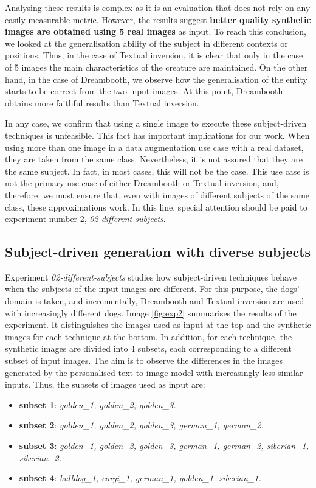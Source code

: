 Analysing these results is complex as it is an evaluation that does not rely on any easily measurable metric. However, the results suggest \textbf{better quality synthetic images are obtained using 5 real images} as input. To reach this conclusion, we looked at the generalisation ability of the subject in different contexts or positions. Thus, in the case of Textual inversion, it is clear that only in the case of 5 images the main characteristics of the creature are maintained. On the other hand, in the case of Dreambooth, we observe how the generalisation of the entity starts to be correct from the two input images. At this point, Dreambooth obtains more faithful results than Textual inversion.

In any case, we confirm that using a single image to execute these subject-driven techniques is unfeasible. This fact has important implications for our work. When using more than one image in a data augmentation use case with a real dataset, they are taken from the same class. Nevertheless, it is not assured that they are the same subject. In fact, in most cases, this will not be the case. This use case is not the primary use case of either Dreambooth or Textual inversion, and, therefore, we must ensure that, even with images of different subjects of the same class, these approximations work. In this line, special attention should be paid to experiment number 2, \textit{02-different-subjects}.

\subsection{Subject-driven generation with diverse subjects} \label{sec: exp-02}

Experiment \textit{02-different-subjects} studies how subject-driven techniques behave when the subjects of the input images are different. For this purpose, the dogs' domain is taken, and incrementally, Dreambooth and Textual inversion are used with increasingly different dogs. Image \ref{fig:exp2} summarises the results of the experiment. It distinguishes the images used as input at the top and the synthetic images for each technique at the bottom. In addition, for each technique, the synthetic images are divided into 4 subsets, each corresponding to a different subset of input images. The aim is to observe the differences in the images generated by the personalised text-to-image model with increasingly less similar inputs. Thus, the subsets of images used as input are:

\begin{itemize}
    \item \textbf{subset 1}: \textit{golden\_1, golden\_2, golden\_3.}
    \item \textbf{subset 2}: \textit{golden\_1, golden\_2, golden\_3, german\_1, german\_2.}
    \item \textbf{subset 3}: \textit{golden\_1, golden\_2, golden\_3, german\_1, german\_2, siberian\_1, siberian\_2.}
    \item \textbf{subset 4}: \textit{bulldog\_1, corgi\_1, german\_1, golden\_1, siberian\_1.}
\end{itemize}

